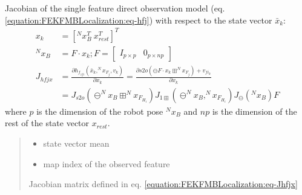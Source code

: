 \documentclass[letterpaper,10pt,english]{sphinxmanual}
\begin{document}
\begin{fulllineitems}
\begin{fulllineitems}
\label{\detokenize{FEKFMBLocalization:MapFeature.MapFeature.Jhfjx}}
\pysigstartsignatures
{}
\pysigstopsignatures
\sphinxAtStartPar
Jacobian of the single feature direct  observation model {\hyperref[\detokenize{FEKFMBLocalization:MapFeature.MapFeature.hfj}]{}} (eq. \eqref{equation:FEKFMBLocalization:eq-hfj})  with respect to the state vector \(\bar{x}_k\):
\begin{equation}\label{equation:FEKFMBLocalization:eq-Jhfjx}
\begin{split}x_k&=[^Nx_B^T~x_{rest}^T]^T\\
^Nx_B&= F \cdot x_k ; F=\begin{bmatrix} I_{p\times p} & 0_{p\times np} \end{bmatrix}\\
J_{hfjx}&=\frac{\partial h_{f_{zfi}}(\bar{x}_k, ^Nx_{F_j},v_k)}{\partial {x}_k}=
\frac{\partial s2o(\ominus F \cdot x_k \boxplus ^Nx_{F_j})+v_{fi_k}}{\partial {x}_k}\\&=
 J_{s2o}(\ominus ^Nx_B \boxplus^Nx_{F_{H_i}}) J_{1\boxplus}(\ominus ^Nx_B,^Nx_{F_{H_i}} ) J_{\ominus}(^Nx_B ) F\end{split}
\end{equation}
\sphinxAtStartPar
where \(p\) is the dimension of the robot pose \(^Nx_B\) and \(np\) is the dimension of the rest of the state vector \(x_{rest}\).
\begin{quote}\begin{description}
\begin{itemize}
\item {} 
\sphinxAtStartPar
{} \textendash{} state vector mean

\item {} 
\sphinxAtStartPar
{} \textendash{} map index of the observed feature

\end{itemize}

\sphinxAtStartPar
Jacobian matrix defined in eq. \eqref{equation:FEKFMBLocalization:eq-Jhfjx}

\end{description}\end{quote}


\end{fulllineitems}
\end{fulllineitems}
\end{document}
